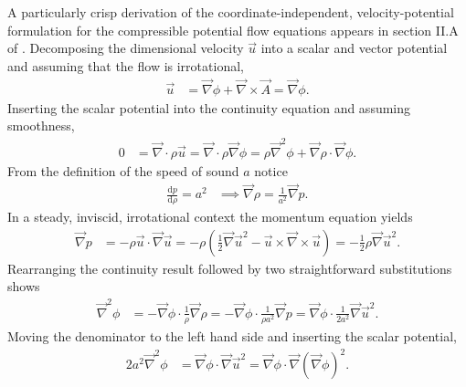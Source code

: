 \documentclass[letterpaper,11pt,nointlimits,reqno]{amsart}
\begin{document}
A particularly crisp derivation of the coordinate-independent,
velocity-potential formulation for the compressible potential flow equations
appears in section II.A of \citet{Saad2011Coordinate}.  Decomposing the
dimensional velocity $\vec{u}$ into a scalar and vector potential and assuming
that the flow is irrotational,
\begin{align}
  \vec{u} &= \vec{\nabla}\phi + \vec{\nabla}\times\vec{A} =  \vec{\nabla}\phi
.
\end{align}
Inserting the scalar potential into the continuity equation and assuming
smoothness,
\begin{align}
  0 &= \vec{\nabla}\cdot\rho\vec{u}
     = \vec{\nabla}\cdot\rho\vec{\nabla}\phi
     = \rho\vec{\nabla}^2\phi
     + \vec{\nabla}\rho\cdot\vec{\nabla}\phi
.
\end{align}
From the definition of the speed of sound $a$ notice
\begin{align}
    \frac{\mathrm{d}p}{\mathrm{d}\rho} = a^2
    &\implies
    \vec{\nabla}\rho = \frac{1}{a^2} \vec{\nabla} p
\label{eq:gradrho_gradp_relationship}
.
\end{align}
In a steady, inviscid, irrotational context the momentum equation yields
\begin{align}
    \vec{\nabla}p
    &= -\rho \vec{u}\cdot\vec{\nabla}\vec{u}
     = -\rho \left(   \frac{1}{2}\vec{\nabla}\vec{u}^2
                    - \vec{u}\times\vec{\nabla}\times\vec{u}
        \right)
     = - \frac{1}{2} \rho \vec{\nabla}\vec{u}^2
\label{eq:momentum}
.
\end{align}
Rearranging the continuity result followed by two straightforward substitutions
shows
\begin{align}
    \vec{\nabla}^2\phi
    &= -\vec{\nabla}\phi\cdot\frac{1}{\rho}\vec{\nabla}\rho
     = -\vec{\nabla}\phi\cdot\frac{1}{\rho{}a^2}\vec{\nabla}p
     =  \vec{\nabla}\phi\cdot\frac{1}{2a^2} \vec{\nabla}\vec{u}^2
.
\end{align}
Moving the denominator to the left hand side and inserting the scalar
potential,
\begin{align}
    2 a^2 \vec{\nabla}^2\phi
    &= \vec{\nabla}\phi\cdot \vec{\nabla}\vec{u}^2
     = \vec{\nabla}\phi\cdot \vec{\nabla}\left(\vec{\nabla}\phi\right)^2
\label{eq:cpfgibbs_nothermo_dim}
.
\end{align}
\end{document}
